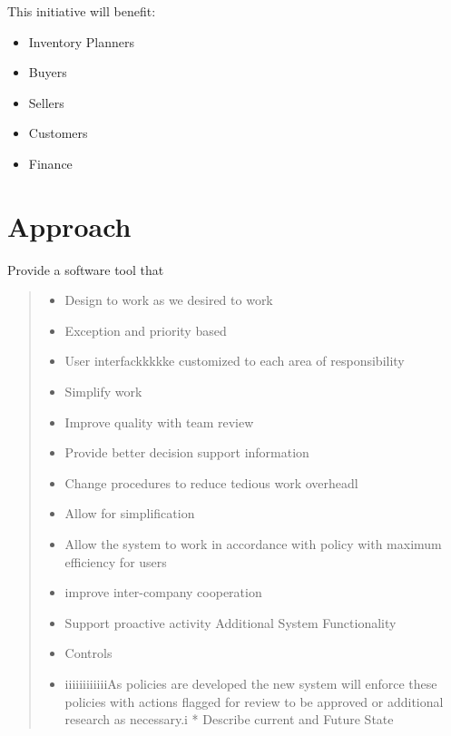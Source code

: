 \documentclass[letterpaper,10pt,english]{sphinxmanual}
\begin{document}
This initiative will benefit:
\begin{itemize}
\item {} 
Inventory Planners

\item {} 
Buyers

\item {} 
Sellers

\item {} 
Customers

\item {} 
Finance

\end{itemize}


\section{Approach}
\label{Introduction/Business-process-improvement:approach}
Provide a software tool that
\begin{quote}
\begin{itemize}
\item {} 
Design to work as we desired to work

\item {} 
Exception and priority based

\item {} 
User interfackkkkke customized to each area of responsibility

\item {} 
Simplify work

\item {} 
Improve quality with team review

\item {} 
Provide better decision support information

\item {} 
Change procedures to reduce tedious work overheadl

\item {} 
Allow for simplification

\item {} 
Allow the system to work in accordance with policy with maximum efficiency for users

\item {} 
improve inter-company  cooperation

\item {} 
Support proactive activity Additional System Functionality

\end{itemize}
\begin{itemize}
\item {} 
Controls

\item {} 
iiiiiiiiiiiiAs policies are developed the new system will enforce these policies with actions flagged for review to be approved or additional research as necessary.i * Describe current and Future State

\end{itemize}
\end{quote}
\end{document}
